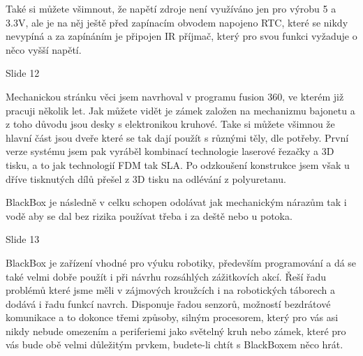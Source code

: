 Také si můžete všimnout, že napětí zdroje není využíváno jen pro výrobu 5 a 3.3V, 
ale je na něj ještě před zapínacím obvodem 
napojeno RTC, které se nikdy nevypíná a za zapínáním je připojen IR příjmač, 
který pro svou funkci vyžaduje o něco vyšší napětí.


Slide 12


Mechanickou stránku věci jsem navrhoval v programu fusion 360, ve kterém již pracuji několik let.
Jak můžete vidět je zámek založen na mechanizmu bajonetu a z toho důvodu jsou desky s elektronikou kruhové.
Take si můžete všimnou že hlavní část jsou dveře které se tak dají použít s různými těly, dle potřeby.
První verze systému jsem pak vyráběl kombinací technologie laserové řezačky a 3D tisku, 
a to jak technologií FDM tak SLA.
Po odzkoušení konstrukce jsem však u dříve tisknutých dílů přešel z 3D tisku na odlévání z polyuretanu. 

BlackBox je následně v celku schopen odolávat jak mechanickým nárazům tak i vodě aby se dal bez rizika 
používat třeba i za deště nebo u potoka. 




Slide 13

BlackBox je zařízení vhodné pro výuku robotiky, 
především programování a dá se také velmi dobře použít i při návrhu rozsáhlých 
zážitkovích akcí. Řeší řadu problémů které jsme měli v zájmových kroužcích i na 
robotických táborech a dodává i řadu funkcí navrch.
Disponuje řadou senzorů, možností bezdrátové komunikace a to dokonce třemi způsoby, 
silným procesorem, který pro vás asi nikdy nebude omezením
a periferiemi jako světelný kruh nebo zámek, které pro vás bude obě velmi důležitým 
prvkem, budete-li chtít s BlackBoxem něco hrát.

